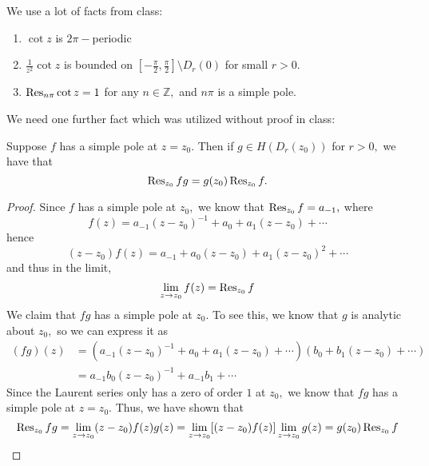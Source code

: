 \documentclass[11pt]{article}
\newcommand{\bbZ}{\mathbb{Z}}
\newcommand{\sm}{\setminus}
\begin{document}
\begin{solution}
    We use a lot of facts from class:
    \begin{enumerate}
        \item $\cot z$ is $2\pi-$periodic
        \item $\frac{1}{z^2}\cot z$ is bounded on $[-\frac{\pi}{2}, \frac{\pi }{2}]\sm D_{r}(0)$ for small $r>0.$
        \item $\Res_{n\pi} \cot z = 1$ for any $n\in \bbZ,$ and $n\pi$ is a simple pole.
    \end{enumerate}
We need one further fact which was utilized without proof in class:
\begin{lemma}
    Suppose $f$ has a simple pole at $z = z_0.$ Then if $g \in H(D_r(z_0))$ for $r>0,$ we have that 
    \[\Res_{z_0}fg = g(z_0)\Res_{z_0}f.\]
\end{lemma}
\begin{proof}
    Since $f$ has a simple pole at $z_0,$ we know that 
    $\Res_{z_0} f = a_{-1},$ where 
    \[f(z) = a_{-1}(z - z_0)^{-1} + a_0 + a_1(z-z_0)+ \cdots\] hence
    \[(z-z_0) f(z)= a_{-1} + a_0(z-z_0) + a_1(z-z_0)^2 + \cdots\] and thus in the limit,
    \[\lim_{z\to z_0}f(z) = \Res_{z_0}f\] We claim that $fg$ has a simple pole at $z_0.$ To see this, we know that $g$ is analytic about $z_0,$ so we can express it as 
    \begin{align*}
    (fg)(z) &= (a_{-1}(z-z_0)^{-1} + a_0 + a_1(z-z_0) + \cdots )(b_0 + b_1(z-z_0) + \cdots ) \\
    &= a_{-1}b_0 (z-z_0)^{-1} + a_{-1}b_1 + \cdots
    \end{align*}
    Since the Laurent series only has a zero of order $1$ at $z_0,$ we know that $fg$ has a simple pole at $z = z_0.$ Thus, we have shown that 
    \[\Res_{z_0} fg = \lim_{z \to z_0}(z - z_0)f(z)g(z) = \lim_{z\to z_0}[(z-z_0)f(z)]\lim_{z\to z_0} g(z) = g(z_0)\Res_{z_0}f\]
   
\end{proof}


\end{solution}
\end{document}
